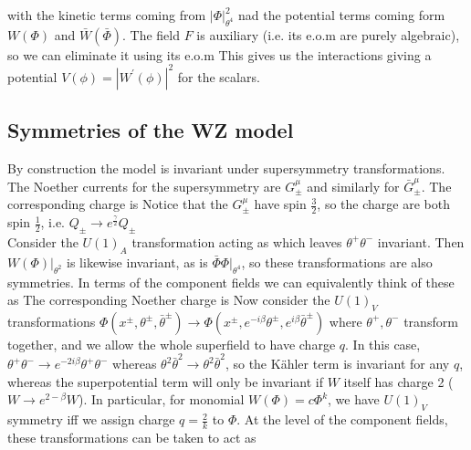 \documentclass{article}
\begin{document}
with the kinetic terms coming from $|\Phi|^2_{\theta^4}$ nad the potential terms coming form $W(\Phi)$ and $\bar{W}(\bar{\Phi})$. The field $F$ is auxiliary (i.e. its e.o.m are purely algebraic), so we can eliminate it using its e.o.m
This gives us the interactions 
giving a potential $V(\phi) = |W^\prime(\phi)|^2$ for the scalars. 

\subsection{Symmetries of the WZ model }
By construction the model is invariant under supersymmetry transformations. The Noether currents for the supersymmetry are $G^\mu_{\pm}$
and similarly for $\bar{G}_\pm^\mu$. The corresponding charge is 
Notice that the $G_\pm^\mu$ have spin $\frac{3}{2}$, so the charge are both spin $\frac{1}{2}$, i.e. $Q_\pm \to e^{\frac{\gamma}{2}}Q_\pm$ \\
Consider the $U(1)_A$ transformation acting as 
which leaves $\theta^+ \theta^- $ invariant. Then $W(\Phi)|_{\theta^2}$ is likewise invariant, as is $\bar{\Phi} \Phi |_{\theta^4}$, so these transformations are also symmetries. In terms of the component fields we can equivalently think of these as 
The corresponding Noether charge is
Now consider the $U(1)_V$  transformations $\Phi(x^\pm,\theta^\pm,\bar{\theta}^\pm) \to \Phi(x^\pm, e^{-i\beta} \theta^\pm , e^{i\beta} \bar{\theta}^\pm)$ where $\theta^+, \theta^-$ transform together, and we allow the whole superfield to have charge $q$. In this case, $\theta^+\theta^- \to e^{-2i\beta} \theta^+\theta^-$ whereas $\theta^2 \bar{\theta}^2 \to \theta^2 \bar{\theta}^2$, so the K\"ahler term is invariant for any $q$, whereas the superpotential term will only be invariant if $W$ itself has charge 2 ($W \to e^{2-\beta} W$). In particular, for monomial $W(\Phi) = c\Phi^k$, we have $U(1)_V$ symmetry iff we assign charge $q = \frac{2}{k}$ to $\Phi$. At the level of the component fields, these transformations can be taken to act as 
\end{document}

